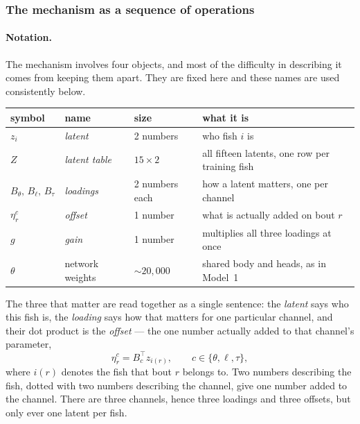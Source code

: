 
\subsubsection{The mechanism as a sequence of operations}

\paragraph{Notation.} The mechanism involves four objects, and most of the
difficulty in describing it comes from keeping them apart. They are fixed here
and these names are used consistently below.

\begin{center}
\begin{tabular}{llll}
\toprule
symbol & name & size & what it is \\
\midrule
$z_i$ & \emph{latent} & 2 numbers & who fish $i$ is \\
$Z$ & \emph{latent table} & $15\times 2$ & all fifteen latents, one row per training fish \\
$B_\theta,\,B_\ell,\,B_\tau$ & \emph{loadings} & 2 numbers each & how a latent matters, one per channel \\
$\eta^c_r$ & \emph{offset} & 1 number & what is actually added on bout $r$ \\
$g$ & \emph{gain} & 1 number & multiplies all three loadings at once \\
$\theta$ & network weights & ${\sim}20{,}000$ & shared body and heads, as in Model~1 \\
\bottomrule
\end{tabular}
\end{center}

\noindent The three that matter are read together as a single sentence: the
\emph{latent} says who this fish is, the \emph{loading} says how that matters
for one particular channel, and their dot product is the \emph{offset} --- the
one number actually added to that channel's parameter,
\begin{equation}
\eta^{c}_{r}=B_c^{\top}z_{i(r)},
\qquad c\in\{\theta,\ell,\tau\},
\label{eq:offset}
\end{equation}
where $i(r)$ denotes the fish that bout $r$ belongs to. Two numbers describing
the fish, dotted with two numbers describing the channel, give one number added
to the channel. There are three channels, hence three loadings and three
offsets, but only ever one latent per fish.

